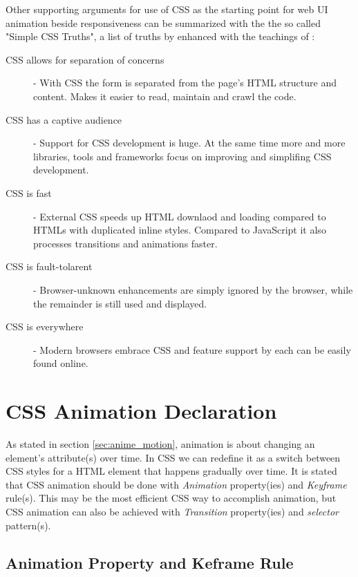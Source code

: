 Other supporting arguments for use of CSS as the starting point for web UI 
animation beside responsiveness can be summarized with the the so called 
"Simple CSS Truths", a list of truths by \citet{palermoCSS} enhanced with the 
teachings of \citet{IAWEB}:

\begin{description}
\item [CSS allows for separation of concerns] -
 With CSS the form is separated from the page's HTML structure and content. 
Makes it easier to read, maintain and crawl the code.

\item [CSS has a captive audience] -
 Support for CSS development is huge. At the same time more and more libraries, 
tools and frameworks focus on improving and simplifing CSS development. 

\item [CSS is fast] - 
 External CSS speeds up HTML downlaod and loading compared to HTMLs with 
duplicated inline styles. Compared to JavaScript it also processes transitions 
and animations faster.

\item [CSS is fault-tolarent] - 
 Browser-unknown enhancements are simply ignored by the browser, while the 
remainder is still used and displayed.

\item [CSS is everywhere] - 
 Modern browsers embrace CSS and feature support by each can be easily found 
online.
\end{description}


\section{CSS Animation Declaration} %
\label{sec:declarationCSS}

As stated in section \ref{sec:anime_motion}, animation is about changing an 
element's attribute(s) over time. In CSS we can redefine it as a switch between 
CSS styles for a HTML element that happens gradually over time. It is stated 
that CSS animation should be done with {\em{}Animation} property(ies) and 
{\em{}Keyframe} rule(s). This may be the most efficient CSS way to accomplish 
animation, but CSS animation can also be achieved with {\em{}Transition} 
property(ies) and {\em{}selector} pattern(s)\citep{w3schoolAnime,w3schoolTrans}.


\subsection{Animation Property and Keframe Rule} %
\label{sub:CSS_animation_keyframe}

